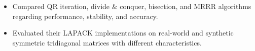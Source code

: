 


\begin{itemize}[nosep]
  \item Compared QR iteration, divide \& conquer, bisection, and MRRR algorithms regarding performance, stability, and accuracy.
  \item Evaluated their LAPACK implementations on real-world and synthetic symmetric tridiagonal matrices with different characteristics.
\end{itemize}
